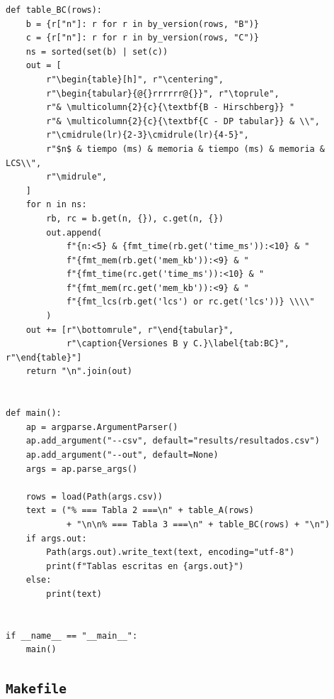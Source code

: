 \documentclass[11pt,a4paper]{article}
\begin{document}
\begin{lstlisting}[style=py, caption={\texttt{src/analyze.py}}]
def table_BC(rows):
    b = {r["n"]: r for r in by_version(rows, "B")}
    c = {r["n"]: r for r in by_version(rows, "C")}
    ns = sorted(set(b) | set(c))
    out = [
        r"\begin{table}[h]", r"\centering",
        r"\begin{tabular}{@{}rrrrrr@{}}", r"\toprule",
        r"& \multicolumn{2}{c}{\textbf{B - Hirschberg}} "
        r"& \multicolumn{2}{c}{\textbf{C - DP tabular}} & \\",
        r"\cmidrule(lr){2-3}\cmidrule(lr){4-5}",
        r"$n$ & tiempo (ms) & memoria & tiempo (ms) & memoria & LCS\\",
        r"\midrule",
    ]
    for n in ns:
        rb, rc = b.get(n, {}), c.get(n, {})
        out.append(
            f"{n:<5} & {fmt_time(rb.get('time_ms')):<10} & "
            f"{fmt_mem(rb.get('mem_kb')):<9} & "
            f"{fmt_time(rc.get('time_ms')):<10} & "
            f"{fmt_mem(rc.get('mem_kb')):<9} & "
            f"{fmt_lcs(rb.get('lcs') or rc.get('lcs'))} \\\\"
        )
    out += [r"\bottomrule", r"\end{tabular}",
            r"\caption{Versiones B y C.}\label{tab:BC}", r"\end{table}"]
    return "\n".join(out)


def main():
    ap = argparse.ArgumentParser()
    ap.add_argument("--csv", default="results/resultados.csv")
    ap.add_argument("--out", default=None)
    args = ap.parse_args()

    rows = load(Path(args.csv))
    text = ("% === Tabla 2 ===\n" + table_A(rows)
            + "\n\n% === Tabla 3 ===\n" + table_BC(rows) + "\n")
    if args.out:
        Path(args.out).write_text(text, encoding="utf-8")
        print(f"Tablas escritas en {args.out}")
    else:
        print(text)


if __name__ == "__main__":
    main()
\end{lstlisting}

\subsection{\texttt{Makefile}}\label{anexo:makefile}
\end{document}
